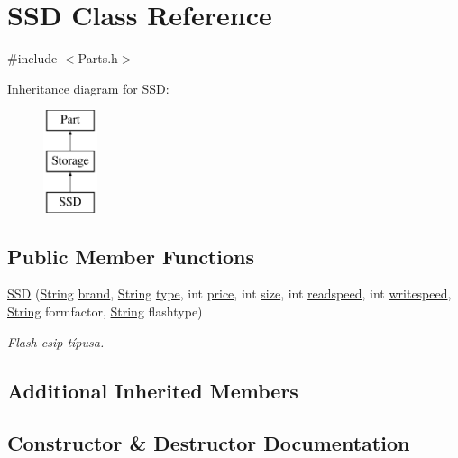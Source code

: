 \hypertarget{class_s_s_d}{}\section{S\+SD Class Reference}
\label{class_s_s_d}


{\ttfamily \#include $<$Parts.\+h$>$}

Inheritance diagram for S\+SD\+:\begin{figure}[H]
\begin{center}
\leavevmode
\includegraphics[height=3.000000cm]{class_s_s_d}
\end{center}
\end{figure}
\subsection*{Public Member Functions}
\begin{DoxyCompactItemize}
\item 
\mbox{\hyperlink{class_s_s_d_a1e80104276b02f8ca6f016f41a2a5f41}{S\+SD}} (\mbox{\hyperlink{class_string}{String}} \mbox{\hyperlink{class_part_ae06f2fdeb7fbbdb229a7aca151f3e341}{brand}}, \mbox{\hyperlink{class_string}{String}} \mbox{\hyperlink{class_part_a101dbcc5c4b21564df7414c7eb0eae88}{type}}, int \mbox{\hyperlink{class_part_a8e71223aed1da95a974f33d8d6c91bb1}{price}}, int \mbox{\hyperlink{class_storage_abcc80ce58a21fa884035617ee0b6cb67}{size}}, int \mbox{\hyperlink{class_storage_a41073842ff16961dad3903e6dd49bb0c}{readspeed}}, int \mbox{\hyperlink{class_storage_a0198a1483ccf849d48c76da88599ba8b}{writespeed}}, \mbox{\hyperlink{class_string}{String}} formfactor, \mbox{\hyperlink{class_string}{String}} flashtype)
\begin{DoxyCompactList}\small\item\em Flash csip típusa. \end{DoxyCompactList}\end{DoxyCompactItemize}
\subsection*{Additional Inherited Members}


\subsection{Constructor \& Destructor Documentation}
\mbox{\label{class_s_s_d_a1e80104276b02f8ca6f016f41a2a5f41}} 
